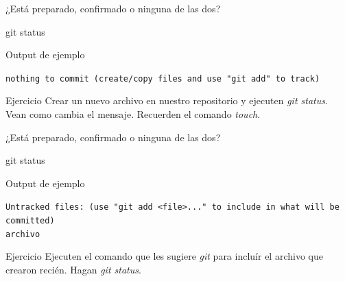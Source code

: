 \begin{frame}[fragile, t]{¿Está preparado, confirmado o ninguna de las dos?}
    \begin{comando}
        git status
    \end{comando}
        \begin{block}{Output de ejemplo}
            \begin{center}
            \texttt{nothing to commit (create/copy files and use "git add" to track)}
            \end{center}
        \end{block}
    \pause
    \begin{ejercicio}{Ejercicio}
        Crear un nuevo archivo en nuestro repositorio y ejecuten \textit{git status}. Vean como cambia el mensaje. Recuerden el comando \textit{touch}.
    \end{ejercicio}

\end{frame}
\begin{frame}[fragile, t]{¿Está preparado, confirmado o ninguna de las dos?}
    \begin{comando}
        git status
    \end{comando}
    \begin{block}{Output de ejemplo}
            \begin{center}
            \texttt{Untracked files:
  (use "git add <file>..." to include in what will be committed) \\archivo}
            \end{center}
        \end{block}
\begin{ejercicio}{Ejercicio}
    Ejecuten el comando que les sugiere \textit{git} para incluír el archivo que crearon recién. Hagan \textit{git status}.
\end{ejercicio}
\end{frame}


